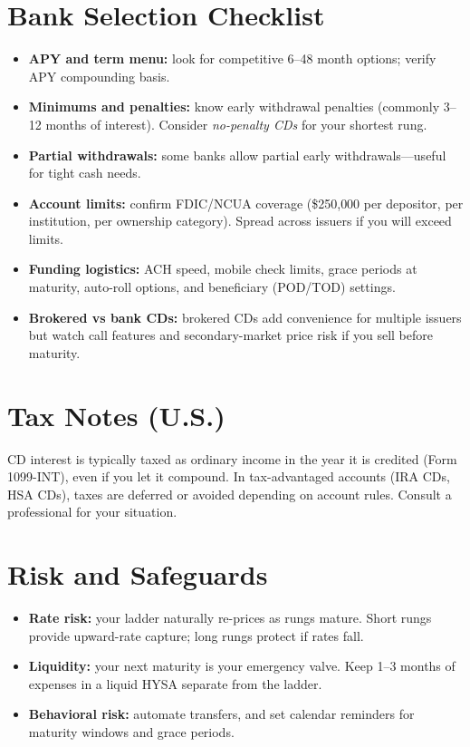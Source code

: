 \documentclass[11pt]{article}
\begin{document}
\section*{Bank Selection Checklist}
\begin{itemize}
  \item \textbf{APY and term menu:} look for competitive 6--48 month options; verify APY compounding basis.
  \item \textbf{Minimums and penalties:} know early withdrawal penalties (commonly 3--12 months of interest). Consider \emph{no-penalty CDs} for your shortest rung.
  \item \textbf{Partial withdrawals:} some banks allow partial early withdrawals---useful for tight cash needs.
  \item \textbf{Account limits:} confirm FDIC/NCUA coverage (\$250{,}000 per depositor, per institution, per ownership category). Spread across issuers if you will exceed limits.
  \item \textbf{Funding logistics:} ACH speed, mobile check limits, grace periods at maturity, auto-roll options, and beneficiary (POD/TOD) settings.
  \item \textbf{Brokered vs bank CDs:} brokered CDs add convenience for multiple issuers but watch call features and secondary-market price risk if you sell before maturity.
\end{itemize}

\section*{Tax Notes (U.S.)}
CD interest is typically taxed as ordinary income in the year it is credited (Form 1099-INT), even if you let it compound. In tax-advantaged accounts (IRA CDs, HSA CDs), taxes are deferred or avoided depending on account rules. Consult a professional for your situation.

\section*{Risk and Safeguards}
\begin{itemize}
  \item \textbf{Rate risk:} your ladder naturally re-prices as rungs mature. Short rungs provide upward-rate capture; long rungs protect if rates fall.
  \item \textbf{Liquidity:} your next maturity is your emergency valve. Keep 1--3 months of expenses in a liquid HYSA separate from the ladder.
  \item \textbf{Behavioral risk:} automate transfers, and set calendar reminders for maturity windows and grace periods.
\end{itemize}
\end{document}
